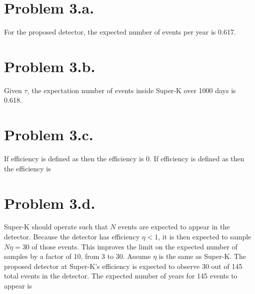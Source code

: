 \documentclass{article}
\begin{document}
\section{Problem 3.a.}
For the proposed detector, the expected number of events per year is 0.617.
\section{Problem 3.b.}
Given $\tau$, the expectation number of events inside Super-K over 1000 days is 0.618.
\section{Problem 3.c.}
If efficiency is defined as
then the efficiency is 0. If efficiency is defined as
then the efficiency is
\section{Problem 3.d.}
Super-K should operate such that $N$ events are expected to appear in the detector. Because the detector has efficiency $\eta<1$, it is then expected to sample $N\eta=30$ of those events. This improves the limit on the expected number of samples by a factor of 10, from 3 to 30. Assume $\eta$ is the same as Super-K.
The proposed detector at Super-K's efficiency is expected to observe 30 out of 145 total events in the detector. The expected number of years for 145 events to appear is
\end{document}
